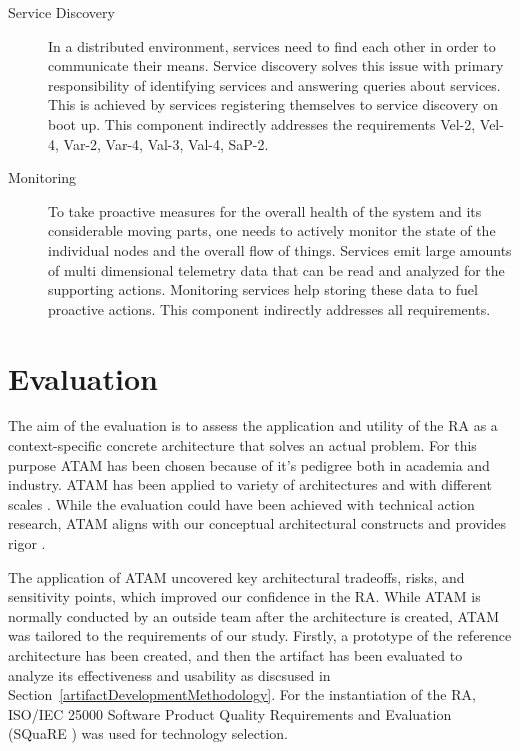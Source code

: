 \documentclass[a4paper,11pt]{article}
\let\cite\citep
\begin{document}
\begin{description}
    \item[Service Discovery] In a distributed environment, services need to find each other in order to communicate their means. Service discovery solves this issue with primary responsibility of identifying services and answering queries about services. This is achieved by services registering themselves to service discovery on boot up. This component indirectly addresses the requirements Vel-2, Vel-4, Var-2, Var-4, Val-3, Val-4, SaP-2. 

    \item[Monitoring] To take proactive measures for the overall health of the system and its considerable moving parts, one needs to actively monitor the state of the individual nodes and the overall flow of things. Services emit large amounts of multi dimensional telemetry data that can be read and analyzed for the supporting actions. Monitoring services help storing these data to fuel proactive actions. This component indirectly addresses all requirements. 

\end{description}


\section{Evaluation}

The aim of the evaluation is to assess the application and utility of the RA as a context-specific concrete architecture that solves an actual problem. For this purpose ATAM has been chosen because of it's pedigree both in academia and industry. ATAM has been applied to variety of architectures and with different scales \cite{SoftwareArchitectureKazman}. While the evaluation could have been achieved with technical action research,  ATAM aligns with our conceptual architectural constructs and provides rigor \cite{wieringa2014design}. 

The application of ATAM uncovered key architectural tradeoffs, risks, and sensitivity points, which improved our confidence in the RA. While ATAM is normally conducted by an outside team after the architecture is created, ATAM was tailored to the requirements of our study. Firstly, a prototype of the reference architecture has been created, and then the artifact has been evaluated to analyze its effectiveness and usability as discsused in Section~\ref{artifactDevelopmentMethodology}. For the instantiation of the RA, ISO/IEC 25000 Software Product Quality Requirements and Evaluation (SQuaRE ) \cite{ISO25000} was used for technology selection. 
\end{document}
